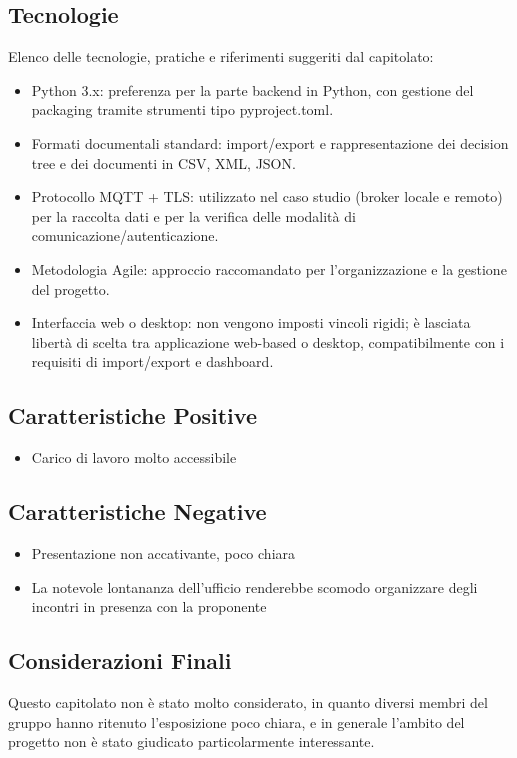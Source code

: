 \documentclass[a4paper,12pt]{article}
\begin{document}
    \subsection{Tecnologie}
    Elenco delle tecnologie, pratiche e riferimenti suggeriti dal capitolato:
    \begin{itemize}
        \item Python 3.x: preferenza per la parte backend in Python, con gestione del packaging tramite strumenti tipo pyproject.toml. 
        \item Formati documentali standard: import/export e rappresentazione dei decision tree e dei documenti in CSV, XML, JSON. 
        \item Protocollo MQTT + TLS: utilizzato nel caso studio (broker locale e remoto) per la raccolta dati e per la verifica delle modalità di comunicazione/autenticazione. 
        \item Metodologia Agile: approccio raccomandato per l’organizzazione e la gestione del progetto. 
        \item Interfaccia web o desktop: non vengono imposti vincoli rigidi; è lasciata libertà di scelta tra applicazione web-based o desktop, compatibilmente con i requisiti di import/export e dashboard.
    \end{itemize}
    \subsection{Caratteristiche Positive}
    \begin{itemize}
        \item Carico di lavoro molto accessibile 
    \end{itemize}
    \subsection{Caratteristiche Negative}
    \begin{itemize}
        \item Presentazione non accativante, poco chiara
        \item La notevole lontananza dell'ufficio renderebbe scomodo organizzare degli incontri in presenza con la proponente 
    \end{itemize}
    \subsection{Considerazioni Finali}
    Questo capitolato non è stato molto considerato, in quanto diversi membri del gruppo hanno ritenuto l'esposizione poco chiara, e in generale l'ambito del progetto non è stato giudicato particolarmente interessante.
\end{document}
